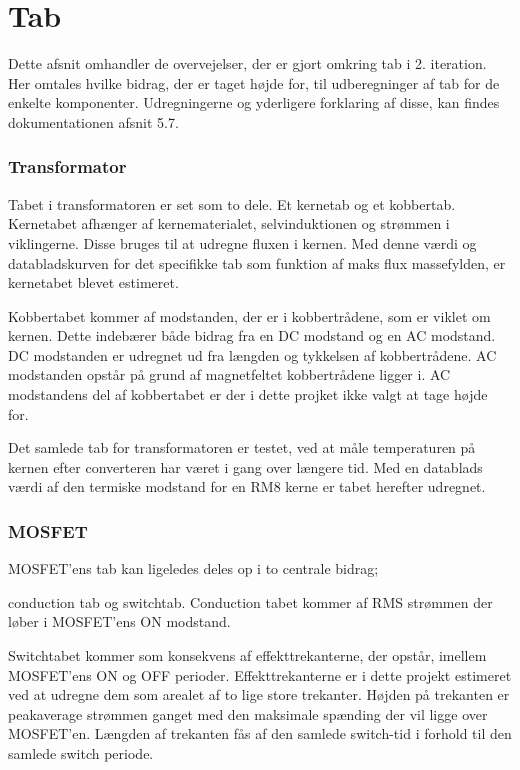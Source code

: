 \section{Tab}
Dette afsnit omhandler de overvejelser, der er gjort omkring tab i 2. iteration. Her omtales hvilke bidrag, der er taget højde for, til udberegninger af tab for de enkelte komponenter. Udregningerne og yderligere forklaring af disse, kan findes dokumentationen afsnit 5.7.

\subsubsection{Transformator}
Tabet i transformatoren er set som to dele. Et kernetab og et kobbertab. Kernetabet afhænger af  kernematerialet, selvinduktionen og strømmen i viklingerne. Disse bruges til at udregne fluxen i kernen. Med denne værdi og databladskurven for det specifikke tab som funktion af maks flux massefylden, er kernetabet blevet estimeret. 

Kobbertabet kommer af modstanden, der er i kobbertrådene, som er viklet om kernen. Dette indebærer både bidrag fra en DC modstand og en AC modstand. DC modstanden er udregnet ud fra længden og tykkelsen af kobbertrådene. AC modstanden opstår på grund af magnetfeltet kobbertrådene ligger i. AC modstandens del af kobbertabet er der i dette projket ikke valgt at tage højde for.

Det samlede tab for transformatoren er testet, ved at måle temperaturen på kernen efter converteren har været i gang over længere tid. Med en datablads værdi af den termiske modstand for en RM8 kerne er tabet herefter udregnet.   

\subsubsection{MOSFET}
MOSFET'ens tab kan ligeledes deles op i to centrale bidrag; 

conduction tab og switchtab. Conduction tabet kommer af RMS strømmen der løber i MOSFET'ens ON modstand. 

Switchtabet kommer som konsekvens af effekttrekanterne, der opstår, imellem MOSFET'ens ON og OFF perioder. Effekttrekanterne er i dette projekt estimeret ved at udregne dem som arealet af to lige store trekanter. Højden på trekanten er peakaverage strømmen ganget med den maksimale spænding der vil ligge over MOSFET'en. Længden af trekanten fås af den samlede switch-tid i forhold til den samlede switch periode. 

